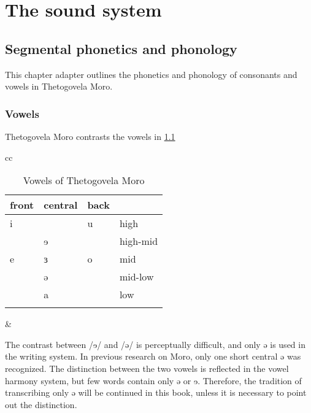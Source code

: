 \part{The sound system}

\chapter{Segmental phonetics and phonology}

This chapter adapter outlines the phonetics and phonology of consonants and vowels in Thetogovela Moro. 

\section{Vowels}

Thetogovela Moro contrasts the vowels in \ref{tab:ch2:1}

\begin{table}
\begin{tabular}{cc}
	\begin{minipage}{.5\linewidth}
	\centering
  \begin{tabular}{llll}
    \lsptoprule
    front  & central  & back & \\
    \midrule
	i 	& 		& 	u 	& 	high \\
		& 	ɘ	& 		& 	high-mid\\
	e 	&	ɜ	&  	o	& 	mid \\
		&  	ə	& 		&	mid-low \\
		& 	a	&		&	low \\
\lspbottomrule
  \end{tabular}
  \caption{Vowels of Thetogovela Moro}
  \label{tab:ch2:1}
  \end{minipage} &
  \begin{minipage}{.5\linewidth}
  \centering
	\begin{vowel}
		\putvowel{\textreve}{49pt}{15pt}
		\putvowel{\textrevepsilon}{50pt}{30pt}
	\end{vowel}
  \end{minipage}
\end{tabular}
\end{table}



The contrast between /ɘ/ and /ə/ is perceptually difficult, and only ə is used in the writing system. In previous research on Moro, only one short central ə was recognized. The distinction between the two vowels is reflected in the vowel harmony system, but few words contain only ə or ɘ. Therefore, the tradition of transcribing only ə will be continued in this book, unless it is necessary to point out the distinction.    

